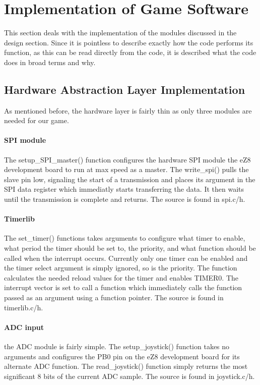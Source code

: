 \section{Implementation of Game Software}

This section deals with the implementation of the modules discussed in the design section.
Since it is pointless to describe exactly how the code performs its function, as this 
can be read directly from the code, it is described what the code does in  broad terms and why. 

\subsection{Hardware Abstraction Layer Implementation}
As mentioned before, the hardware layer is fairly thin as only three modules are needed for our game.

\paragraph{SPI module}
The setup\_SPI\_master() function  configures the hardware SPI module the eZ8 development board to run at max speed as a master.
The write\_spi() pulls the slave pin low, signaling the start of a transmission and places its argument in the SPI data register
which immediatly starts transferring the data. It then waits until the transmission is complete and returns.
The source is found in spi.c/h.

\paragraph{Timerlib}
The set\_timer() functions takes arguments to configure what timer to enable, what period the timer
should be set to, the priority, and what function should be called when the interrupt occurs. Currently
only one timer can be enabled and the timer select argument is simply ignored, so is the priority. 
The function calculates the needed reload values for the timer and enables TIMER0. The interrupt vector
is set to call a function which immediately calls the function passed as an argument using a function pointer.
The source is found in timerlib.c/h.

\paragraph{ADC input}
the ADC module is fairly simple. The setup\_joystick() function takes
no arguments and configures the PB0 pin on the eZ8 development board for its alternate ADC function.
The read\_joystick() function simply returns the most significant 8 bits of the current ADC sample.
The source is found in joystick.c/h.

